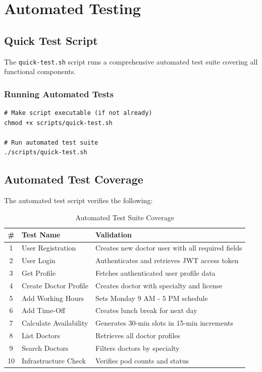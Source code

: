 \documentclass[12pt,a4paper]{article}
\begin{document}
\section{Automated Testing}

\subsection{Quick Test Script}
The \texttt{quick-test.sh} script runs a comprehensive automated test suite covering all functional components.

\subsubsection{Running Automated Tests}
\begin{lstlisting}[style=bash]
# Make script executable (if not already)
chmod +x scripts/quick-test.sh

# Run automated test suite
./scripts/quick-test.sh
\end{lstlisting}

\subsection{Automated Test Coverage}
The automated test script verifies the following:

\begin{table}[h]
\centering
\begin{tabular}{@{}clp{7cm}@{}}
\toprule
\textbf{\#} & \textbf{Test Name} & \textbf{Validation} \\
\midrule
1 & User Registration & Creates new doctor user with all required fields \\
2 & User Login & Authenticates and retrieves JWT access token \\
3 & Get Profile & Fetches authenticated user profile data \\
4 & Create Doctor Profile & Creates doctor with specialty and license \\
5 & Add Working Hours & Sets Monday 9 AM - 5 PM schedule \\
6 & Add Time-Off & Creates lunch break for next day \\
7 & Calculate Availability & Generates 30-min slots in 15-min increments \\
8 & List Doctors & Retrieves all doctor profiles \\
9 & Search Doctors & Filters doctors by specialty \\
10 & Infrastructure Check & Verifies pod counts and status \\
\bottomrule
\end{tabular}
\caption{Automated Test Suite Coverage}
\end{table}
\end{document}

